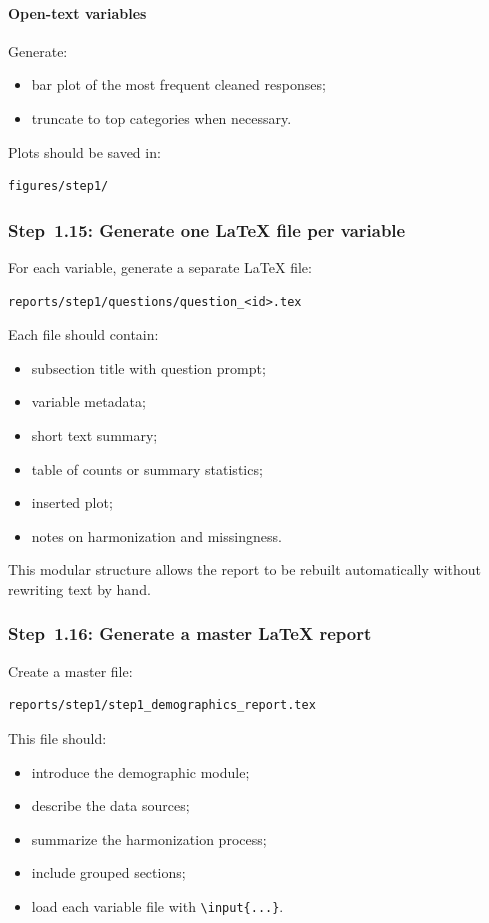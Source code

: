 \documentclass[11pt]{article}
\begin{document}
\paragraph{Open-text variables}
Generate:
\begin{itemize}
    \item bar plot of the most frequent cleaned responses;
    \item truncate to top categories when necessary.
\end{itemize}

Plots should be saved in:
\begin{verbatim}
figures/step1/
\end{verbatim}

\subsubsection{Step~1.15: Generate one \LaTeX{} file per variable}
For each variable, generate a separate \LaTeX{} file:
\begin{verbatim}
reports/step1/questions/question_<id>.tex
\end{verbatim}

Each file should contain:
\begin{itemize}
    \item subsection title with question prompt;
    \item variable metadata;
    \item short text summary;
    \item table of counts or summary statistics;
    \item inserted plot;
    \item notes on harmonization and missingness.
\end{itemize}

This modular structure allows the report to be rebuilt automatically without rewriting text by hand.

\subsubsection{Step~1.16: Generate a master \LaTeX{} report}
Create a master file:
\begin{verbatim}
reports/step1/step1_demographics_report.tex
\end{verbatim}

This file should:
\begin{itemize}
    \item introduce the demographic module;
    \item describe the data sources;
    \item summarize the harmonization process;
    \item include grouped sections;
    \item load each variable file with \texttt{\textbackslash input\{...\}}.
\end{itemize}
\end{document}
